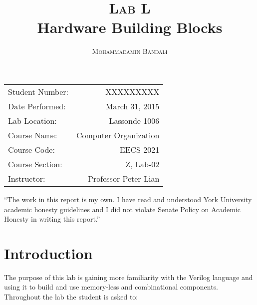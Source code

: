 \documentclass{article}
\title{\textsc{Lab L} \\ Hardware Building Blocks } %
\author{\textsc{Mohammadamin Bandali}} %
\date{} %
\newenvironment{statement}{\par\vspace{50ex}}{\clearpage}
\begin{document}
\maketitle %

\begin{center}
\begin{tabular}{l r}
Student Number: & XXXXXXXXX \\ 
Date Performed: & March 31, 2015 \\ %
Lab Location: & Lassonde 1006 \\ 
Course Name: & Computer Organization \\ 
Course Code: & EECS 2021 \\ 
Course Section: & Z, Lab-02\\ 
Instructor: & Professor Peter Lian %
\end{tabular}
\end{center}

\begin{statement}
“The work in this report is my own. I have read and understood York University
academic honesty guidelines and I did not violate Senate Policy on Academic
Honesty in writing this report.”
\end{statement}


\section{Introduction}

The purpose of this lab is gaining more familiarity with the Verilog language
and using it to build and use memory-less and combinational components.
Throughout the lab the student is asked to:
\end{document}
